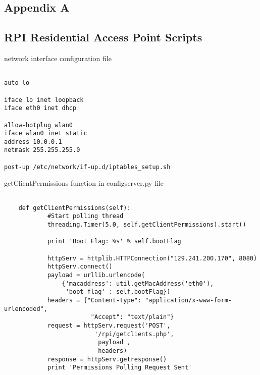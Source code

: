 \appendix
{}
 \renewcommand{\chaptername}{\appendixname}
\begin{appendices}
\chapter{Appendix A}
\label{chp:appendix}
\section{RPI Residential Access Point Scripts}

\begin{algorithm}[h]
  \caption{network interface configuration file}
  \label{code:network_interface}
  \begin{verbatim}
  
auto lo

iface lo inet loopback
iface eth0 inet dhcp

allow-hotplug wlan0
iface wlan0 inet static
address 10.0.0.1
netmask 255.255.255.0

post-up /etc/network/if-up.d/iptables_setup.sh
 \end{verbatim}
\end{algorithm}

\begin{algorithm}[h]
  \caption{getClientPermissions function in configserver.py file}
  \label{code:configserver_py}
  \begin{verbatim}

    def getClientPermissions(self):
            #Start polling thread
            threading.Timer(5.0, self.getClientPermissions).start()
            
            print 'Boot Flag: %s' % self.bootFlag
            
            httpServ = httplib.HTTPConnection("129.241.200.170", 8080)
            httpServ.connect()
            payload = urllib.urlencode(
	            {'macaddress': util.getMacAddress('eth0'),
	             'boot_flag' : self.bootFlag})
            headers = {"Content-type": "application/x-www-form-urlencoded",
            			"Accept": "text/plain"}
            request = httpServ.request('POST',
            			 '/rpi/getclients.php',
            			  payload ,
            			  headers)
            response = httpServ.getresponse()
            print 'Permissions Polling Request Sent'
            

\end{verbatim}
\end{algorithm}
\end{appendices}
